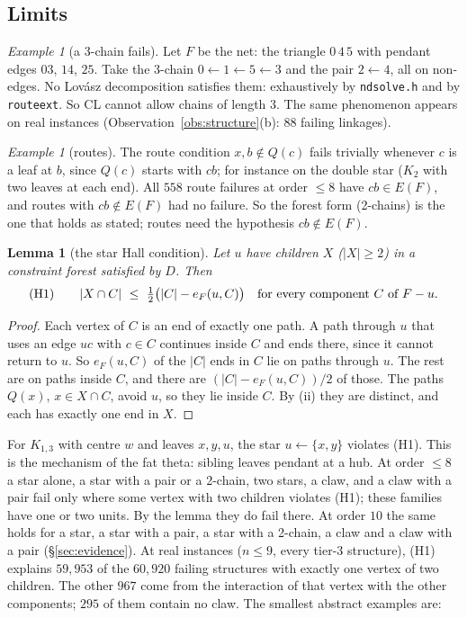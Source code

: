 \documentclass[11pt]{amsart}
\newtheorem{lemma}[theorem]{Lemma}
\theoremstyle{definition}
\theoremstyle{remark}
\newtheorem{example}[theorem]{Example}
\renewcommand{\_}{\oldunderscore\allowbreak}
\begin{document}
\subsection{Limits}\label{sec:limits}

\begin{example}[a 3-chain fails]\label{ex:net}
Let $F$ be the net: the triangle $0\,4\,5$ with pendant edges $03$, $14$, $25$. Take the 3-chain
$0\leftarrow1\leftarrow5\leftarrow3$ and the pair $2\leftarrow4$, all on non-edges. No Lov\'asz
decomposition satisfies them: exhaustively by \texttt{ndsolve.h} and by \texttt{route\_ext}. So
CL cannot allow chains of length $3$. The same phenomenon appears on real instances
(Observation~\ref{obs:structure}(b): $88$ failing linkages).
\end{example}

\begin{example}[routes]
The route condition $x,b\notin Q(c)$ fails trivially whenever $c$ is a leaf at $b$, since $Q(c)$
starts with $cb$; for instance on the double star ($K_2$ with two leaves at each end). All $558$
route failures at order $\le8$ have $cb\in E(F)$, and routes with $cb\notin E(F)$ had no failure.
So the forest form (2-chains) is the one that holds as stated; routes need the hypothesis
$cb\notin E(F)$.
\end{example}

\begin{lemma}[the star Hall condition]\label{lem:hall}
Let $u$ have children $X$ ($|X|\ge2$) in a constraint forest satisfied by $D$. Then
\[
\textup{(H1)}\qquad |X\cap C|\ \le\ \tfrac12\bigl(|C|-e_F(u,C)\bigr)\quad\text{for every
component $C$ of $F-u$.}
\]
\end{lemma}

\begin{proof}
Each vertex of $C$ is an end of exactly one path. A path through $u$ that uses an edge $uc$ with
$c\in C$ continues inside $C$ and ends there, since it cannot return to $u$. So $e_F(u,C)$ of the
$|C|$ ends in $C$ lie on paths through $u$. The rest are on paths inside $C$, and there are
$(|C|-e_F(u,C))/2$ of those. The paths $Q(x)$, $x\in X\cap C$, avoid $u$, so they lie inside $C$.
By (ii) they are distinct, and each has exactly one end in $X$.
\end{proof}

For $K_{1,3}$ with centre $w$ and leaves $x,y,u$, the star $u\leftarrow\{x,y\}$ violates (H1). This is
the mechanism of the fat theta: sibling leaves pendant at a hub. At order $\le8$ a star alone, a
star with a pair or a 2-chain, two stars, a claw, and a claw with a pair fail only where some vertex
with two children violates (H1); these families have one or two units. By the lemma they do fail
there. At order $10$ the same holds for a star, a star with a pair, a star with a 2-chain, a claw and a
claw with a pair (\S\ref{sec:evidence}). At real instances ($n\le9$, every tier-3 structure), (H1) explains $59{,}953$ of the
$60{,}920$ failing structures with exactly one vertex of two children. The other $967$ come from
the interaction of that vertex with the other components; $295$ of them contain no claw. The
smallest abstract examples are:
\end{document}
